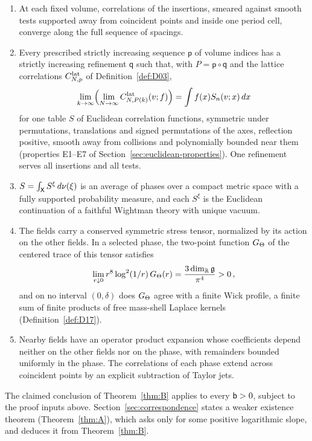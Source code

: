 \begin{enumerate}[label=\textup{(\roman*)},nosep]
\item At each fixed volume, correlations of the insertions, smeared against smooth tests supported away from coincident points and inside one period cell, converge along the full sequence of spacings.
\item Every prescribed strictly increasing sequence $\mathsf p$ of volume indices has a strictly increasing refinement $\mathsf q$ such that, with $P=\mathsf p\circ\mathsf q$ and the lattice correlations $C^{\mathrm{lat}}_{N,p}$ of Definition~\ref{def:D03},
\begin{equation}\label{eq:intro-ordered-limit}
\lim_{k\to\infty}\Bigl(\lim_{N\to\infty}C^{\mathrm{lat}}_{N,P(k)}(v;f)\Bigr)=\int f(x)S_n(v;x)\,dx
\end{equation}
for one table $S$ of Euclidean correlation functions, symmetric under permutations, translations and signed permutations of the axes, reflection positive, smooth away from collisions and polynomially bounded near them (properties E1--E7 of Section~\ref{sec:euclidean-properties}). One refinement serves all insertions and all tests.
\item $S=\int_{\mathsf{X}}S^\xi\,d\nu(\xi)$ is an average of phases over a compact metric space with a fully supported probability measure, and each $S^\xi$ is the Euclidean continuation of a faithful Wightman theory with unique vacuum.
\item The fields carry a conserved symmetric stress tensor, normalized by its action on the other fields. In a selected phase, the two-point function $G_{\Theta}$ of the centered trace of this tensor satisfies
\begin{equation}\label{eq:intro-trace-law}
\lim_{r\downarrow0}r^8\log^2(1/r)\,G_{\Theta}(r)=\frac{3\dim_{\mathbb{R}}\mathfrak{g}}{\pi^4}>0\,,
\end{equation}
and on no interval $(0,\delta)$ does $G_{\Theta}$ agree with a finite Wick profile, a finite sum of finite products of free mass-shell Laplace kernels (Definition~\ref{def:D17}).
\item Nearby fields have an operator product expansion whose coefficients depend neither on the other fields nor on the phase, with remainders bounded uniformly in the phase. The correlations of each phase extend across coincident points by an explicit subtraction of Taylor jets.
\end{enumerate}
The claimed conclusion of Theorem~\ref{thm:B} applies to every $\mathsf{b}>0$, subject to the proof inputs above. Section~\ref{sec:correspondence} states a weaker existence theorem (Theorem~\ref{thm:A}), which asks only for some positive logarithmic slope, and deduces it from Theorem~\ref{thm:B}.

